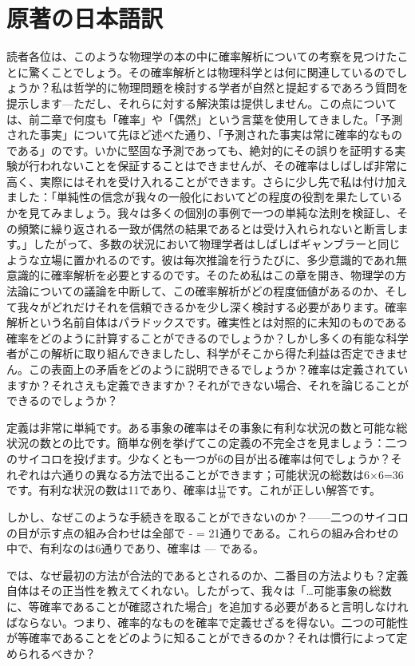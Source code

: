 \documentclass[a4paper,11pt,openany]{ltjsbook}
\begin{document}
\section{原著の日本語訳}
読者各位は、このような物理学の本の中に確率解析についての考察を見つけたことに驚くことでしょう。その確率解析とは物理科学とは何に関連しているのでしょうか？私は哲学的に物理問題を検討する学者が自然と提起するであろう質問を提示します—ただし、それらに対する解決策は提供しません。この点については、前二章で何度も「確率」や「偶然」という言葉を使用してきました。「予測された事実」について先ほど述べた通り、「予測された事実は常に確率的なものである」のです。いかに堅固な予測であっても、絶対的にその誤りを証明する実験が行われないことを保証することはできませんが、その確率はしばしば非常に高く、実際にはそれを受け入れることができます。さらに少し先で私は付け加えました：「単純性の信念が我々の一般化においてどの程度の役割を果たしているかを見てみましょう。我々は多くの個別の事例で一つの単純な法則を検証し、その頻繁に繰り返される一致が偶然の結果であるとは受け入れられないと断言します。」したがって、多数の状況において物理学者はしばしばギャンブラーと同じような立場に置かれるのです。彼は每次推論を行うたびに、多少意識的であれ無意識的に確率解析を必要とするのです。そのため私はこの章を開き、物理学の方法論についての議論を中断して、この確率解析がどの程度価値があるのか、そして我々がどれだけそれを信頼できるかを少し深く検討する必要があります。確率解析という名前自体はパラドックスです。確実性とは対照的に未知のものである確率をどのように計算することができるのでしょうか？しかし多くの有能な科学者がこの解析に取り組んできましたし、科学がそこから得た利益は否定できません。この表面上の矛盾をどのように説明できるでしょうか？確率は定義されていますか？それさえも定義できますか？それができない場合、それを論じることができるのでしょうか？

定義は非常に単純です。ある事象の確率はその事象に有利な状況の数と可能な総状況の数との比です。簡単な例を挙げてこの定義の不完全さを見ましょう：二つのサイコロを投げます。少なくとも一つが6の目が出る確率は何でしょうか？それぞれは六通りの異なる方法で出ることができます；可能状況の総数は6×6=36です。有利な状況の数は11であり、確率は\(\frac{11}{36}\)です。これが正しい解答です。

しかし、なぜこのような手続きを取ることができないのか？——二つのサイコロの目が示す点の組み合わせは全部で - = 21通りである。これらの組み合わせの中で、有利なのは6通りであり、確率は — である。

では、なぜ最初の方法が合法的であるとされるのか、二番目の方法よりも？定義自体はその正当性を教えてくれない。したがって、我々は「…可能事象の総数に、等確率であることが確認された場合」を追加する必要があると言明しなければならない。つまり、確率的なものを確率で定義せざるを得ない。二つの可能性が等確率であることをどのように知ることができるのか？それは慣行によって定められるべきか？
\end{document}
